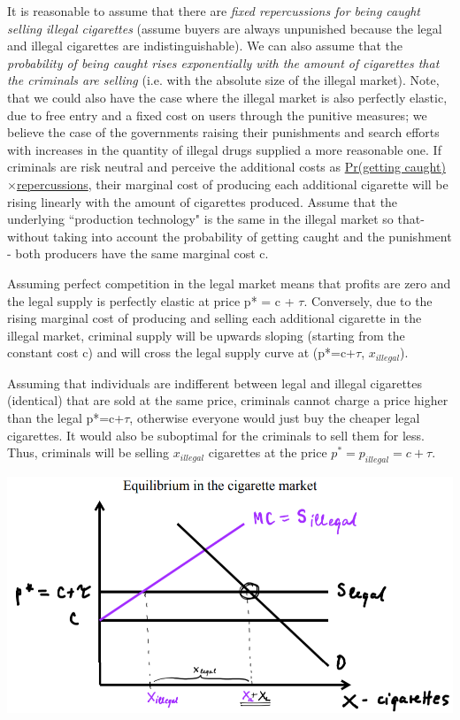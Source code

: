 \documentclass{article}
\begin{document}
It is reasonable to assume that there are \textit{fixed repercussions
  for being caught selling illegal cigarettes} (assume buyers are
always unpunished because the legal and illegal cigarettes are
indistinguishable). We can also assume that the \textit{probability of
  being caught rises exponentially with the amount of
  cigarettes that the criminals are selling} (i.e. with the absolute
size of the illegal market). Note, that we could also have the case where the illegal market is
also perfectly elastic, due to free entry and a fixed cost on users through the punitive measures; we believe
the case of the governments raising their punishments and search efforts with increases in the quantity of illegal 
drugs supplied a more reasonable one.
If criminals are risk neutral and
perceive the additional costs as \underline{Pr(getting
  caught)$\times$repercussions}, their marginal cost of producing each
additional cigarette will be rising linearly with the amount of
cigarettes produced. Assume that the underlying ``production
technology" is the same in the illegal market so that- without taking
into account the probability of getting caught and the punishment -
both producers have the same marginal cost c.

Assuming perfect competition in the legal market means that profits
are zero and the legal supply is perfectly elastic at price p* = c +
$\tau$. Conversely, due to the rising marginal cost of producing and
selling each additional cigarette in the illegal market, criminal
supply will be upwards sloping (starting from the constant cost c) and
will cross the legal supply curve at (p*=c+$\tau$, $x_{illegal}$).

Assuming that individuals are indifferent between legal and illegal
cigarettes (identical) that are sold at the same price, criminals
cannot charge a price higher than the legal p*=c+$\tau$, otherwise
everyone would just buy the cheaper legal cigarettes. It would also be
suboptimal for the criminals to sell them for less. Thus, criminals
will be selling $x_{illegal}$ cigarettes at the price
$p^{*}=p_{illegal}=c+\tau$.

\centerline{\includegraphics[width=.5\textwidth]{graph1.png}}
\end{document}
